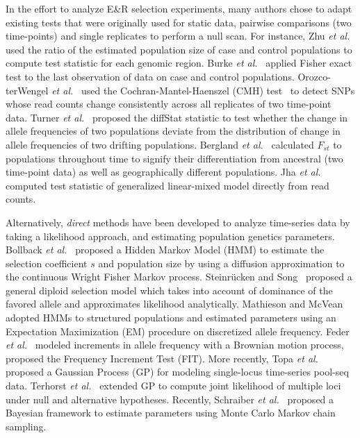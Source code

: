 In the effort to analyze E\&R selection experiments, many authors
chose to adapt existing tests that were originally used for static
data, pairwise comparisons (two time-points) and single replicates to
perform a null scan.  For instance, Zhu \emph{et
  al.}~\cite{zhou2011experimental} used the ratio of the estimated
population size of case and control populations to compute test
statistic for each genomic region. Burke \emph{et
  al.}~\cite{burke2010genome} applied Fisher exact test to the last
observation of data on case and control populations.  Orozco-terWengel
\emph{et al.}~\cite{orozco2012adaptation} used the
Cochran-Mantel-Haenszel (CMH) test~\cite{agresti2011categorical} to
detect SNPs whose read counts change consistently across all
replicates of two time-point data. Turner \emph{et
  al.}~\cite{turner2011population} proposed the diffStat statistic to
test whether the change in allele frequencies of two populations
deviate from the distribution of change in allele frequencies of two
drifting populations. Bergland \emph{et
  al.}~\cite{bergland2014genomic} calculated $F_{st}$ to populations
throughout time to signify their differentiation from ancestral (two
time-point data) as well as geographically different populations. Jha
\emph{et al.}~\cite{jha2015whole} computed test statistic of
generalized linear-mixed model directly from read counts.



Alternatively, \emph{direct} methods have been developed to analyze
time-series data by taking a likelihood approach, and estimating
population genetics parameters.  Bollback \emph{et
  al.}~\cite{bollback2008estimation} proposed a Hidden Markov Model
(HMM) to estimate the selection coefficient $s$ and population size by
using a diffusion approximation to the continuous Wright Fisher Markov
process.  Steinr\"{u}cken and Song~\cite{steinrucken2014novel}
proposed a general diploid selection model which takes into account of
dominance of the favored allele and approximates likelihood
analytically.  Mathieson and McVean~\cite{mathieson2013estimating}
adopted HMMs to structured populations and estimated parameters using
an Expectation Maximization (EM) procedure on discretized allele
frequency.  Feder \emph{et al.}~\cite{feder2014Identifying} modeled
increments in allele frequency with a Brownian motion process,
proposed the Frequency Increment Test (FIT). More recently, Topa
\emph{et al.}~\cite{topa2015gaussian} proposed a Gaussian Process (GP)
for modeling single-locus time-series pool-seq data. Terhorst \emph{et
  al.}~\cite{Terhorst2015Multi} extended GP to compute joint
likelihood of multiple loci under null and alternative hypotheses.
Recently, Schraiber \emph{et al.}~\cite{schraiber2016bayesian}
proposed a Bayesian framework to estimate parameters using Monte Carlo
Markov chain sampling.


